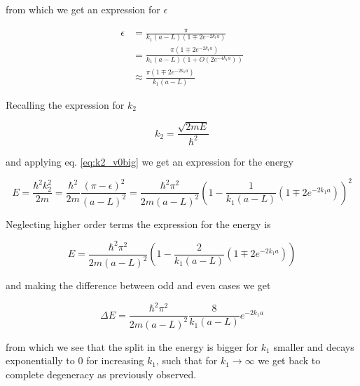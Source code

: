\documentclass{article}
\begin{document}
from which we get an expression for \(\epsilon\)

\begin{align}
\epsilon & = \frac{\pi}{k_1(a-L)\left(1 \mp 2e^{-2k_1a} \right)} \nonumber \\
& = \frac{\pi \left(1 \mp 2e^{-2k_1a} \right)}{k_1(a-L)\left(1 + O\left(2e^{-4k_1a} \right) \right)} \nonumber \\
& \approx \frac{\pi \left(1 \mp 2e^{-2k_1a} \right)}{k_1(a-L)}
\end{align}

Recalling the expression for \(k_2\)

\begin{equation*}
k_2 = \frac{\sqrt{2mE}}{\hbar^2}
\end{equation*}

and applying eq. \eqref{eq:k2_v0big} we get an expression for the energy

\begin{equation}
E = \frac{\hbar^2 k_2^2}{2m} = \frac{\hbar^2}{2m} \frac{(\pi - \epsilon)^2}{(a-L)^2} = \frac{\hbar^2 \pi^2}{2m(a-L)^2} \left(1 - \frac{1}{k_1(a-L)} \left( 1 \mp 2e^{-2k_1a} \right) \right)^2
\end{equation}

Neglecting higher order terms the expression for the energy is

\begin{equation}
E = \frac{\hbar^2 \pi^2}{2m(a-L)^2} \left(1 - \frac{2}{k_1(a-L)} \left( 1 \mp 2e^{-2k_1a} \right) \right)
\end{equation}

and making the difference between odd and even cases we get

\begin{equation}
\Delta E = \frac{\hbar^2 \pi^2}{2m(a-L)^2} \frac{8}{k_1(a-L)} e^{-2k_1a}
\end{equation}

from which we see that the split in the energy is bigger for \(k_1\) smaller and decays exponentially to \(0\) for increasing \(k_1\), such that for \(k_1 \rightarrow \infty\) we get back to complete degeneracy as previously observed.
\end{document}
